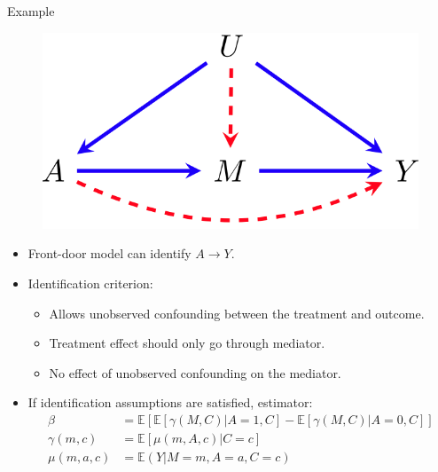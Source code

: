 \documentclass{beamer}
\begin{document}
\begin{frame}{Example}
	\begin{figure}
		\center
		\includegraphics[scale=0.2]{m2.png}
	\end{figure}
	\begin{itemize}
		\item Front-door model can identify $ A \rightarrow Y $.
		\item Identification criterion:
			\begin{itemize}
				\item Allows unobserved confounding between the treatment and outcome.
				\item Treatment effect should only go through mediator.
				\item No effect of unobserved confounding on the mediator.
			\end{itemize}
		\item If identification assumptions are satisfied, estimator:
			\begin{equation*}
				\begin{split}
					\beta &= \mathbb{E}[\mathbb{E}[\gamma(M, C) | A = 1, C] - \mathbb{E}[\gamma(M, C) | A =0, C]] \\
					\gamma(m, c) &= \mathbb{E}[\mu(m, A, c) | C=c] \\
					\mu(m, a, c) &= \mathbb{E}(Y | M=m, A=a, C=c)
				\end{split}
			\end{equation*}
	\end{itemize}
\end{frame}
\end{document}
